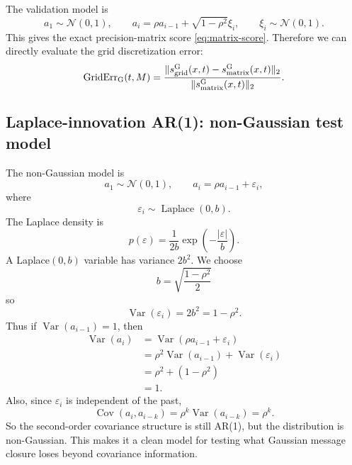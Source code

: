 \documentclass[11pt]{article}
\newcommand{\Var}{\operatorname{Var}}
\newcommand{\Cov}{\operatorname{Cov}}
\newcommand{\Normal}{\mathcal{N}}
\begin{document}
The validation model is
\begin{equation}
  a_1\sim\Normal(0,1),
  \qquad
  a_i=\rho a_{i-1}+\sqrt{1-\rho^2}\xi_i,
  \qquad \xi_i\sim\Normal(0,1).
\end{equation}
This gives the exact precision-matrix score \eqref{eq:matrix-score}. Therefore we can directly evaluate the grid discretization error:
\begin{equation}
  \operatorname{GridErr}_{\rm G}(t,M)
  =
  \frac{\|s_{\rm grid}^{\rm G}(x,t)-s_{\rm matrix}^{\rm G}(x,t)\|_2}
  {\|s_{\rm matrix}^{\rm G}(x,t)\|_2}.
\end{equation}

\subsection{Laplace-innovation AR(1): non-Gaussian test model}

The non-Gaussian model is
\begin{equation}
  a_1\sim\Normal(0,1),
  \qquad
  a_i=\rho a_{i-1}+\varepsilon_i,
\end{equation}
where
\begin{equation}
  \varepsilon_i\sim\operatorname{Laplace}(0,b).
\end{equation}
The Laplace density is
\begin{equation}
  p(\varepsilon)=\frac{1}{2b}\exp\left(-\frac{|\varepsilon|}{b}\right).
\end{equation}
A Laplace\((0,b)\) variable has variance \(2b^2\). We choose
\begin{equation}
  b=\sqrt{\frac{1-\rho^2}{2}}
\end{equation}
so
\begin{equation}
  \Var(\varepsilon_i)=2b^2=1-\rho^2.
\end{equation}
Thus if \(\Var(a_{i-1})=1\), then
\begin{align}
  \Var(a_i)
  &= \Var(\rho a_{i-1}+\varepsilon_i)\\
  &= \rho^2\Var(a_{i-1})+\Var(\varepsilon_i)\\
  &= \rho^2+(1-\rho^2)\\
  &=1.
\end{align}
Also, since \(\varepsilon_i\) is independent of the past,
\begin{equation}
  \Cov(a_i,a_{i-k})=\rho^k\Var(a_{i-k})=\rho^k.
\end{equation}
So the second-order covariance structure is still AR(1), but the distribution is non-Gaussian. This makes it a clean model for testing what Gaussian message closure loses beyond covariance information.
\end{document}
